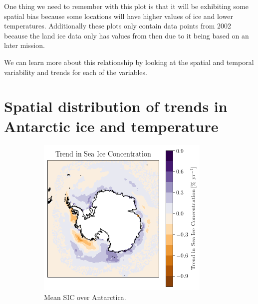 \documentclass[../main.tex]{subfiles}
\begin{document}
One thing we need to remember with this plot is that it will be exhibiting some spatial bias because some locations will have higher values of ice and lower temperatures. Additionally these plots only contain data points from 2002 because the land ice data only has values from then due to it being based on an later mission. 

We can learn more about this relationship by looking at the spatial and temporal variability and trends for each of the variables.

\section[Spatial distribution of trends]{Spatial distribution of trends in Antarctic ice and temperature}

\begin{figure}[H]
\centering
\begin{subfigure}[h!]{0.49\textwidth}
\includegraphics[width=\textwidth]{images/week8/lres/trend_sic_distribution}
\caption{Mean SIC over Antarctica.}
\end{subfigure}
\begin{subfigure}[h!]{0.49\textwidth}

\end{subfigure}
\end{figure}
\end{document}
